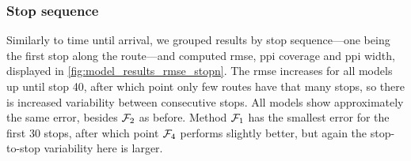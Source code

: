 \subsubsection{Stop sequence}

Similarly to time until arrival, we grouped results by stop sequence---one being the first stop along the route---and computed \gls{rmse}, \gls{ppi} coverage and \gls{ppi} width, displayed in \cref{fig:model_results_rmse_stopn}. The \gls{rmse} increases for all models up until stop 40, after which point only few routes have that many stops, so there is increased variability between consecutive stops. All models show approximately the same error, besides $\mathcal{F}_2$ as before. Method $\mathcal{F}_1$ has the smallest error for the first 30 stops, after which point $\mathcal{F}_4$ performs slightly better, but again the stop-to-stop variability here is larger.



